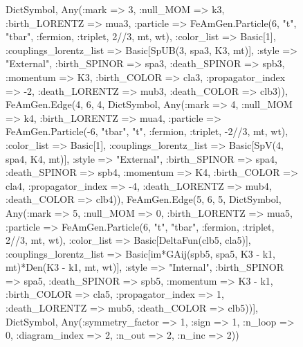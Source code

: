 \documentclass{revtex4}
\begin{document}
\begin{figure}[!htb]
\begin{center}
{Dict{Symbol, Any}(:mark => 3, :null_MOM => k3, :birth_LORENTZ => mua3, :particle => FeAmGen.Particle(6, "t", "tbar", :fermion, :triplet, 2//3, mt, wt), :color_list => Basic[1], :couplings_lorentz_list => Basic[SpUB(3, spa3, K3, mt)], :style => "External", :birth_SPINOR => spa3, :death_SPINOR => spb3, :momentum => K3, :birth_COLOR => cla3, :propagator_index => -2, :death_LORENTZ => mub3, :death_COLOR => clb3)), FeAmGen.Edge(4, 6, 4, Dict{Symbol, Any}(:mark => 4, :null_MOM => k4, :birth_LORENTZ => mua4, :particle => FeAmGen.Particle(-6, "tbar", "t", :fermion, :triplet, -2//3, mt, wt), :color_list => Basic[1], :couplings_lorentz_list => Basic[SpV(4, spa4, K4, mt)], :style => "External", :birth_SPINOR => spa4, :death_SPINOR => spb4, :momentum => K4, :birth_COLOR => cla4, :propagator_index => -4, :death_LORENTZ => mub4, :death_COLOR => clb4)), FeAmGen.Edge(5, 6, 5, Dict{Symbol, Any}(:mark => 5, :null_MOM => 0, :birth_LORENTZ => mua5, :particle => FeAmGen.Particle(6, "t", "tbar", :fermion, :triplet, 2//3, mt, wt), :color_list => Basic[DeltaFun(clb5, cla5)], :couplings_lorentz_list => Basic[im*GAij(spb5, spa5, K3 - k1, mt)*Den(K3 - k1, mt, wt)], :style => "Internal", :birth_SPINOR => spa5, :death_SPINOR => spb5, :momentum => K3 - k1, :birth_COLOR => cla5, :propagator_index => 1, :death_LORENTZ => mub5, :death_COLOR => clb5))], Dict{Symbol, Any}(:symmetry_factor => 1, :sign => 1, :n_loop => 0, :diagram_index => 2, :n_out => 2, :n_inc => 2)) 
}
\end{center}
\end{figure}
\end{document}
